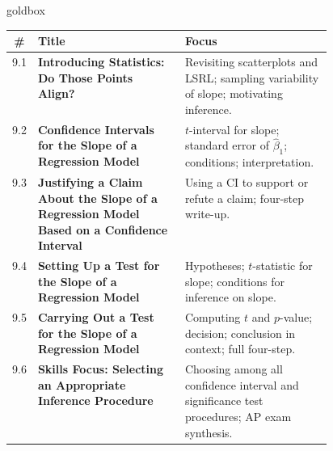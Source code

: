 \documentclass[10pt]{article}
\begin{document}
\renewcommand{\arraystretch}{1.35}
\begin{skillbox}{goldbox}
\small
\begin{tabularx}{\linewidth}{@{} c >{\bfseries}p{0.46\linewidth} X @{}}
  \textbf{\#} & \textbf{Title} & \textbf{Focus} \\
  \hline
  9.1 & Introducing Statistics: Do Those Points Align?
      & Revisiting scatterplots and LSRL; sampling variability of slope; motivating inference. \\
  \hline
  9.2 & Confidence Intervals for the Slope of a Regression Model
      & $t$-interval for slope; standard error of $\hat{\beta}_1$; conditions; interpretation. \\
  \hline
  9.3 & Justifying a Claim About the Slope of a Regression Model Based on a Confidence Interval
      & Using a CI to support or refute a claim; four-step write-up. \\
  \hline
  9.4 & Setting Up a Test for the Slope of a Regression Model
      & Hypotheses; $t$-statistic for slope; conditions for inference on slope. \\
  \hline
  9.5 & Carrying Out a Test for the Slope of a Regression Model
      & Computing $t$ and $p$-value; decision; conclusion in context; full four-step. \\
  \hline
  9.6 & Skills Focus: Selecting an Appropriate Inference Procedure
      & Choosing among all confidence interval and significance test procedures; AP exam synthesis. \\
  \hline
\end{tabularx}
\end{skillbox}

\vspace{0.12in}
\end{document}
